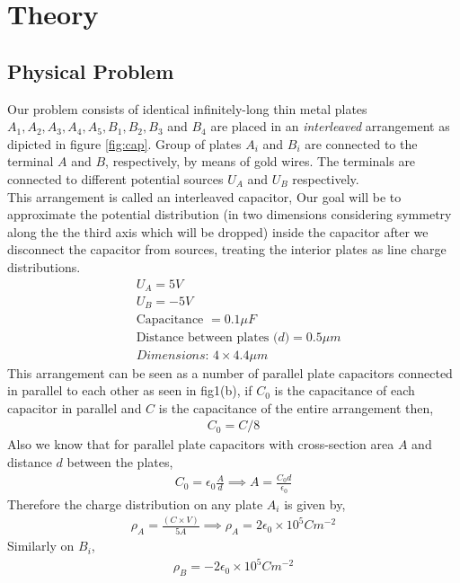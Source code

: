 \section{Theory}
\subsection{Physical Problem}
Our problem consists of identical infinitely-long thin metal plates $A_1,A_2,A_3,A_4,A_5,B_1,B_2,B_3 $ and $B_4$ are placed in an \textit{interleaved} arrangement as dipicted in figure \ref{fig:cap}. Group of plates $A_i$ and $B_i$ are connected to the terminal $A$ and $B$, respectively, by means of gold wires. The terminals are connected to different potential sources $U_A$ and $U_B$ respectively. \\
This arrangement is called an interleaved capacitor, Our goal will be to approximate the potential distribution (in two dimensions considering symmetry along the the third axis which will be dropped) inside the capacitor after we disconnect the capacitor from sources, treating the interior plates as line charge distributions.
\begin{align*}
    &U_A = 5V \\
    &U_B = -5V \\
    &\text{Capacitance } = 0.1\mu F\\
    &\text{Distance between plates ($d$)} = 0.5\mu m \\
    &\textit{Dimensions: } 4 \times 4.4 \mu m  
\end{align*}
This arrangement can be seen as a number of parallel plate capacitors connected in parallel to each other as seen in fig1(b),
if $C_0$ is the capacitance of each capacitor in parallel and $C$ is the capacitance of the entire arrangement then,
\begin{align*}
    C_0 = C/8
\end{align*}
Also we know that for parallel plate capacitors with cross-section area $A$ and distance $d$ between the plates,
\begin{align}
    C_0 = \epsilon_0 \frac{A}{d} \implies A = \frac{C_0d}{\epsilon_0}
\end{align}
Therefore the charge distribution on any plate $A_i$ is given by,
\begin{align}
    \rho_A = \frac{(C \times V )}{5A} \implies \rho_A = 2\epsilon_0 \times 10^5C m^{-2} 
\end{align}
Similarly on $B_i$,
\begin{align}
    \rho_B = -2\epsilon_0 \times 10^5C m^{-2} 
\end{align}

